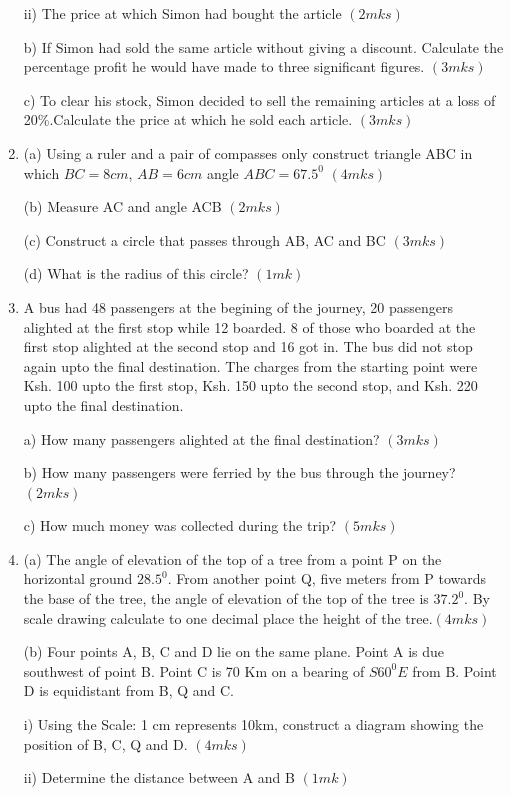 \documentclass[
  a4paperpaper,
]{scrbook}
\begin{document}
\begin{tcolorbox}
\begin{enumerate}
  ii) The price at which Simon had bought the article \((2mks)\)

  b) If Simon had sold the same article without giving a discount.
  Calculate the percentage profit he would have made to three
  significant figures. \((3mks)\)

  c) To clear his stock, Simon decided to sell the remaining articles at
  a loss of 20\%.Calculate the price at which he sold each article.
  \((3mks)\)
\item
  (a) Using a ruler and a pair of compasses only construct triangle ABC
  in which \(BC = 8cm\), \(AB = 6cm\) angle \(ABC = 67.5^0\) \((4mks)\)

  (b) Measure AC and angle ACB \((2mks)\)

  (c) Construct a circle that passes through AB, AC and BC \((3mks)\)

  (d) What is the radius of this circle? \((1mk)\)
\item
  A bus had 48 passengers at the begining of the journey, 20 passengers
  alighted at the first stop while 12 boarded. 8 of those who boarded at
  the first stop alighted at the second stop and 16 got in. The bus did
  not stop again upto the final destination. The charges from the
  starting point were Ksh. 100 upto the first stop, Ksh. 150 upto the
  second stop, and Ksh. 220 upto the final destination.

  a) How many passengers alighted at the final destination? \((3mks)\)

  b) How many passengers were ferried by the bus through the journey?
  \((2mks)\)

  c) How much money was collected during the trip? \((5mks)\)
\item
  (a) The angle of elevation of the top of a tree from a point P on the
  horizontal ground \(28.5^0\). From another point Q, five meters from P
  towards the base of the tree, the angle of elevation of the top of the
  tree is \(37.2^0\). By scale drawing calculate to one decimal place
  the height of the tree.\((4mks)\)

  (b) Four points A, B, C and D lie on the same plane. Point A is due
  southwest of point B. Point C is 70 Km on a bearing of \(S60^0E\) from
  B. Point D is equidistant from B, Q and C.

  i) Using the Scale: 1 cm represents 10km, construct a diagram showing
  the position of B, C, Q and D. \((4mks)\)

  ii) Determine the distance between A and B \((1mk)\)


\end{enumerate}
\end{tcolorbox}
\end{document}
